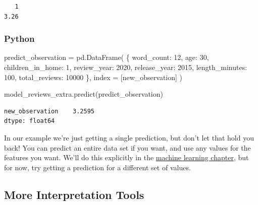 \documentclass[
  letterpaper,
]{krantz}
\newenvironment{Shaded}{}{}
\newcommand{\DecValTok}[1]{\textcolor[rgb]{0.25,0.63,0.44}{#1}}
\newcommand{\NormalTok}[1]{#1}
\newcommand{\OperatorTok}[1]{\textcolor[rgb]{0.40,0.40,0.40}{#1}}
\newcommand{\StringTok}[1]{\textcolor[rgb]{0.25,0.44,0.63}{#1}}
\begin{document}
\begin{verbatim}
   1 
3.26 
\end{verbatim}

\subsubsection{Python}

\begin{Shaded}
\begin{Highlighting}[]
\NormalTok{predict\_observation }\OperatorTok{=}\NormalTok{ pd.DataFrame(}
\NormalTok{    \{}
        \StringTok{\textquotesingle{}word\_count\textquotesingle{}}\NormalTok{: }\DecValTok{12}\NormalTok{,}
        \StringTok{\textquotesingle{}age\textquotesingle{}}\NormalTok{: }\DecValTok{30}\NormalTok{,}
        \StringTok{\textquotesingle{}children\_in\_home\textquotesingle{}}\NormalTok{: }\DecValTok{1}\NormalTok{,}
        \StringTok{\textquotesingle{}review\_year\textquotesingle{}}\NormalTok{: }\DecValTok{2020}\NormalTok{,}
        \StringTok{\textquotesingle{}release\_year\textquotesingle{}}\NormalTok{: }\DecValTok{2015}\NormalTok{,}
        \StringTok{\textquotesingle{}length\_minutes\textquotesingle{}}\NormalTok{: }\DecValTok{100}\NormalTok{,}
        \StringTok{\textquotesingle{}total\_reviews\textquotesingle{}}\NormalTok{: }\DecValTok{10000}
\NormalTok{    \},}
\NormalTok{    index }\OperatorTok{=}\NormalTok{ [}\StringTok{\textquotesingle{}new\_observation\textquotesingle{}}\NormalTok{]}
\NormalTok{)}

\NormalTok{model\_reviews\_extra.predict(predict\_observation)}
\end{Highlighting}
\end{Shaded}

\begin{verbatim}
new_observation    3.2595
dtype: float64
\end{verbatim}

In our example we're just getting a single prediction, but don't let
that hold you back! You can predict an entire data set if you want, and
use any values for the features you want. We'll do this explicitly in
the \hyperref[machine-learning]{machine learning chapter}, but for now,
try getting a prediction for a different set of values.

\subsection{More Interpretation Tools}\label{more-interpretation-tools}
\end{document}
